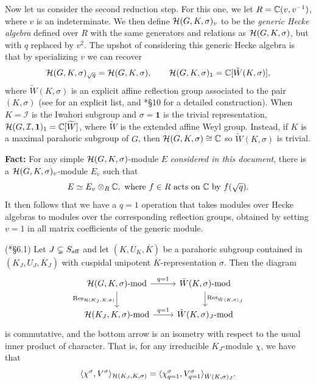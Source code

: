 Now let us consider the second reduction step. For this one, we let $R=\mathbb{C}(v,v^{-1})$, where $v$ is an indeterminate. We then define $\mathcal{H}(G,K,\sigma)_v$ to be the \textit{generic Hecke algebra} defined over $R$ with the same generators and relations as $\mathcal{H}(G,K,\sigma)$, but with $q$ replaced by $v^2$. The upshot of considering this generic Hecke algebra is that by specializing $v$ we can recover
$$\mathcal{H}(G,K,\sigma)_{\sqrt{q}}=\mathcal{H}(G,K,\sigma),\quad\quad \mathcal{H}(G,K,\sigma)_1=\mathbb{C}[\tilde{W}(K,\sigma)],$$
where $\tilde{W}(K,\sigma)$ is an explicit affine reflection group associated to the pair $(K,\sigma)$ (see \cite{Lusztig1995} for an explicit list, and \cite{Carter1985}*{\S10} for a detailed construction). When $K=\mathcal{I}$ is the Iwahori subgroup and $\sigma=\mathbf{1}$ is the trivial representation, $\mathcal{H}(G,\mathcal{I},\mathbf{1})_1=\mathbb{C}[\widetilde{W}]$, where $\widetilde{W}$ is the extended affine Weyl group. Instead, if $K$ is a maximal parahoric subgroup of $G$, then $\mathcal{H}(G,K,\sigma)\cong\mathbb{C}$ so $\tilde{W}(K,\sigma)$ is trivial.

\textbf{Fact:} For any simple $\mathcal{H}(G,K,\sigma)$-module $E$ \textit{considered in this document}, there is a $\mathcal{H}(G,K,\sigma)_v$-module $E_v$ such that 
\[
    E\simeq E_v\otimes_R\mathbb{C}, \text{ where }f\in R\text{ acts on $\mathbb{C}$ by }f(\sqrt{q}).
\]
It then follows that we have a $q=1$ operation that takes modules over Hecke algebras to modules over the corresponding reflection groups, obtained by setting $v=1$ in all matrix coefficients of the generic module.

\begin{proposition}\label{prop:second_red}(\cite{Reeder2000}*{\S6.1})
    Let $J\subsetneq S_{\mathrm{aff}}$ and let $(K,U_K,\overline{K})$ be a parahoric subgroup contained in $(K_J,U_J,\overline{K}_J)$ with cuspidal unipotent $\overline{K}$-representation $\sigma$. Then the diagram 
    \[
        \begin{tikzcd}
        \cH(G,K,\sigma)\textrm{-mod} \arrow[r, "q=1"] \arrow[d, "\Res_{\cH(K_J,K,\sigma)}"'] & \tilde{W}(K,\sigma)\textrm{-mod} \arrow[d, "\Res_{\tilde{W}(K,\sigma)_J}"] \\
        \cH(K_J,K,\sigma)\textrm{-mod} \arrow[r, "q=1"] & \tilde{W}(K,\sigma)_J\textrm{-mod}
        \end{tikzcd}
    \]
    is commutative, and the bottom arrow is an isometry with respect to the usual inner product of character. That is, for any irreducible $K_J$-module $\chi$, we have that 
    \begin{equation}
        \langle\chi^\sigma,V^\sigma\rangle_{\mathcal{H}(K_J,K,\sigma)}=\langle\chi^\sigma_{q=1},V^\sigma_{q=1}\rangle_{\tilde{W}(K,\sigma)_J}.
    \end{equation}
\end{proposition}

